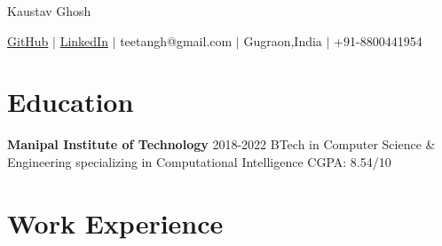 \documentclass{article}
\begin{document}
\thispagestyle{empty}  %




\begin{center}
    \huge{Kaustav Ghosh} %

    \normalsize{
        \textmd{
            \href{https://www.github.com/teetangh}{GitHub} \(|\)
            \href{https://www.linkedin.com/in/kaustav-ghosh-1538651bb/}{LinkedIn} \(|\)
            teetangh@gmail.com \(|\)
            Gugraon,India \(|\)
            +91-8800441954
        }}
\end{center}


\section*{Education}

\textbf{Manipal Institute of Technology} \hfill \textmd{2018-2022}
\textmd{\newline \textmd{BTech in Computer Science \& Engineering specializing in Computational Intelligence}}
\hfill \textmd{CGPA: 8.54/10}




\section*{Work Experience}
\end{document}
